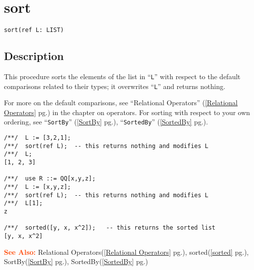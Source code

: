 \documentclass[a4paper]{mybook}
\newenvironment{command}{}{} %
\newcommand\SeeAlso{\par\textcolor{OrangeRed}{\textbf{\large See Also: }}}
\begin{document}
\section{sort}
\label{sort}
\begin{command} %


\begin{Verbatim}[label=syntax, rulecolor=\color{MidnightBlue},
frame=single]
sort(ref L: LIST)
\end{Verbatim}


\subsection*{Description}

This procedure sorts the elements of the list in ``\verb&L&'' with respect
to the default comparisons related to their types; it overwrites ``\verb&L&'' and
returns nothing.
\par 
For more on the default comparisons, see ``Relational Operators'' (\ref{Relational Operators} pg.\pageref{Relational Operators})
in the chapter on operators.
For sorting with respect to your own ordering, see ``\verb&SortBy&'' (\ref{SortBy} pg.\pageref{SortBy}), ``\verb&SortedBy&'' (\ref{SortedBy} pg.\pageref{SortedBy}).
\begin{Verbatim}[label=example, rulecolor=\color{PineGreen}, frame=single]
/**/  L := [3,2,1];
/**/  sort(ref L);  -- this returns nothing and modifies L
/**/  L;
[1, 2, 3]

/**/  use R ::= QQ[x,y,z];
/**/  L := [x,y,z];
/**/  sort(ref L);  -- this returns nothing and modifies L
/**/  L[1];
z

/**/  sorted([y, x, x^2]);   -- this returns the sorted list
[y, x, x^2]
\end{Verbatim}


\SeeAlso %
  Relational Operators(\ref{Relational Operators} pg.\pageref{Relational Operators}), 
    sorted(\ref{sorted} pg.\pageref{sorted}), 
    SortBy(\ref{SortBy} pg.\pageref{SortBy}), 
    SortedBy(\ref{SortedBy} pg.\pageref{SortedBy})
\end{command} %
\end{document}
